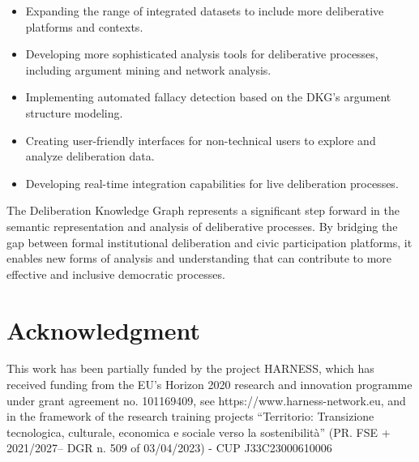 \documentclass[runningheads]{llncs}  %
\begin{document}
\begin{itemize}
    \item Expanding the range of integrated datasets to include more deliberative platforms and contexts.
    \item Developing more sophisticated analysis tools for deliberative processes, including argument mining and network analysis.
    \item Implementing automated fallacy detection based on the DKG's argument structure modeling.
    \item Creating user-friendly interfaces for non-technical users to explore and analyze deliberation data.
    \item Developing real-time integration capabilities for live deliberation processes.
\end{itemize}

The Deliberation Knowledge Graph represents a significant step forward in the semantic representation and analysis of deliberative processes. By bridging the gap between formal institutional deliberation and civic participation platforms, it enables new forms of analysis and understanding that can contribute to more effective and inclusive democratic processes.

\section*{Acknowledgment}
This work has been partially funded by the project HARNESS, which has received funding from the EU’s Horizon 2020 research and innovation programme under grant agreement no. 101169409, see https://www.harness-network.eu, and in the framework of the research training projects “Territorio: Transizione tecnologica, culturale, economica e sociale verso la sostenibilità” (PR. FSE + 2021/2027– DGR n. 509 of 03/04/2023) - CUP J33C23000610006


\end{document}
